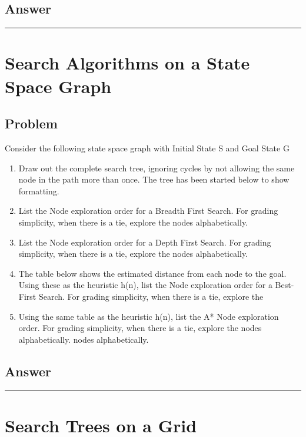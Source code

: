 \documentclass[11pt]{article}
\begin{document}
\begin{flushleft}
\subsection*{Answer}

\hspace{1cm}
\hrule
\section*{Search Algorithms on a State Space Graph}

\subsection*{Problem}
Consider the following state space graph with Initial State S and Goal State G

\begin{enumerate}
    \item Draw out the complete search tree, ignoring cycles by not allowing
        the same node in the path more than once. The tree has been started
        below to show formatting.
    \item List the Node exploration order for a Breadth First Search. For
        grading simplicity, when there is a tie, explore the nodes
        alphabetically.
    \item List the Node exploration order for a Depth First Search. For grading
        simplicity, when there is a tie, explore the nodes alphabetically.
    \item The table below shows the estimated distance from each node to the
        goal. Using these as the heuristic h(n), list the Node exploration
        order for a Best-First Search. For grading simplicity, when there is a
        tie, explore the
    \item Using the same table as the heuristic h(n), list the A* Node
        exploration order. For grading simplicity, when there is a tie, explore
        the nodes alphabetically. nodes alphabetically.
\end{enumerate}

\subsection*{Answer}

\hspace{1cm}
\hrule
\section*{Search Trees on a Grid}


\end{flushleft}
\end{document}
